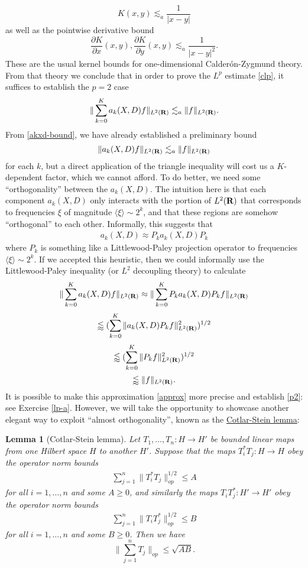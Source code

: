 \documentclass[11pt]{article}
\newtheorem{lemma}[theorem]{Lemma}
\theoremstyle{definition}
\begin{document}
\[\displaystyle  K(x,y) \lesssim_a \frac{1}{|x-y|}\]
 as well as the pointwise derivative bound 
\[\displaystyle  \frac{\partial K}{\partial x}(x,y), \frac{\partial K}{\partial y}(x,y) \lesssim_{a} \frac{1}{|x-y|^2}.\]
 These are the usual kernel bounds for one-dimensional Calderón-Zygmund theory. From that theory we conclude that in order to prove the \({L^p}\) estimate \eqref{clp}, it suffices to establish the \({p=2}\) case 
\begin{align}\label{p2}
  \| \sum_{k=0}^K a_k(X,D) f\|_{L^2({\bf R})} \lesssim_{a} \|f\|_{L^2({\bf R})}. 
\end{align}
 From \eqref{akxd-bound}, we have already established a preliminary bound 
\[\displaystyle  \| a_k(X,D) f\|_{L^2({\bf R})} \lesssim_{a} \|f\|_{L^2({\bf R})}\]
 for each \({k}\), but a direct application of the triangle inequality will cost us a \({K}\)-dependent factor, which we cannot afford. To do better, we need some “orthogonality” between the \({a_k(X,D)}\). The intuition here is that each component \({a_k(X,D)}\) only interacts with the portion of \({L^2({\bf R})}\) that corresponds to frequencies \({\xi}\) of magnitude \({\langle \xi \rangle \sim 2^k}\), and that these regions are somehow “orthogonal” to each other. Informally, this suggests that 
\begin{align}\label{approx}
  a_k(X,D) \approx P_k a_k(X,D) P_k 
\end{align}
 where \({P_k}\) is something like a Littlewood-Paley projection operator to frequencies \({\langle \xi \rangle \sim 2^k}\). If we accepted this heuristic, then we could informally use the Littlewood-Paley inequality (or \({L^2}\) decoupling theory) to calculate 
\[\displaystyle  \| \sum_{k=0}^K a_k(X,D) f \|_{L^2({\bf R})} \approx \| \sum_{k=0}^K P_k a_k(X,D) P_k f \|_{L^2({\bf R})} \]
\[\displaystyle  \lessapprox (\sum_{k=0}^K \| a_k(X,D) P_k f \|_{L^2({\bf R})}^2)^{1/2}\]
\[\displaystyle  \lessapprox (\sum_{k=0}^K \| P_k f \|_{L^2({\bf R})}^2)^{1/2}\]
\[\displaystyle  \lessapprox \|f\|_{L^2({\bf R})}.\]
 It is possible to make this approximation \eqref{approx} more precise and establish \eqref{p2}: see Exercise \ref{lp-a}. However, we will take the opportunity to showcase another elegant way to exploit “almost orthogonality”, known as the \href{https://en.wikipedia.org/wiki/Cotlar%E2%80%93Stein_lemma}{Cotlar-Stein lemma}:
\begin{lemma}[Cotlar-Stein lemma]
  Let \({T_1,\dots,T_n: H \rightarrow H'}\) be bounded linear maps from one Hilbert space \({H}\) to another \({H'}\). Suppose that the maps \({T_i^* T_j: H \rightarrow H}\) obey the operator norm bounds 
\begin{align}\label{hi}
  \sum_{j=1}^n \|T_i^* T_j\|_{op}^{1/2} \leq A 
\end{align}
 for all \({i=1,\dots,n}\) and some \({A \geq 0}\), and similarly the maps \({T_i T_j^*: H' \rightarrow H'}\) obey the operator norm bounds 
\begin{align}\label{lo}
  \sum_{j=1}^n \|T_i T_j^*\|_{op}^{1/2} \leq B 
\end{align}
 for all \({i=1,\dots,n}\) and some \({B \geq 0}\). Then we have 
\[\displaystyle  \| \sum_{j=1}^n T_j \|_{op} \leq \sqrt{AB}.\]

\end{lemma}
\end{document}
